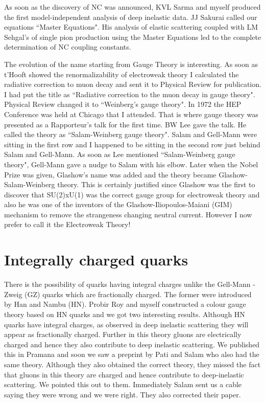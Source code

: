 As soon as the discovery of NC was announced, KVL Sarma and myself 
produced the first model-independent analysis of deep inelastic data. JJ 
Sakurai called our equations ``Master Equations". His analysis of elastic 
scattering coupled with LM Sehgal's of single pion production using the 
Master Equations led to the complete determination of NC coupling 
constants.

The evolution of the name starting from Gauge Theory is interesting. As 
soon as t'Hooft showed the renormalizability of electroweak theory I 
calculated the radiative correction to muon decay and sent it to 
Physical Review for publication. I had put the title as ``Radiative 
correction to the muon decay in gauge theory". Physical Review changed 
it to ``Weinberg's gauge theory". In 1972 the HEP Conference was held at 
Chicago that I attended. That is where gauge theory was presented as a 
Rapporteur's talk for the first time. BW Lee gave the talk. He called 
the theory as ``Salam-Weinberg gauge theory". Salam and Gell-Mann were 
sitting in the first row and I happened to be sitting in the second row 
just behind Salam and Gell-Mann. As soon as Lee mentioned 
``Salam-Weinberg gauge theory", Gell-Mann gave a nudge to Salam with his 
elbow. Later when the Nobel Prize was given, Glashow's name was added 
and the theory became Glashow-Salam-Weinberg theory. This is certainly 
justified since Glashow was the first to discover that SU(2)xU(1) was 
the correct gauge group for electroweak theory and also he was one of 
the inventors of the Glashow-Iliopoulos-Maiani (GIM) mechanism to remove 
the strangeness changing neutral current. However I now prefer to call 
it the Electroweak Theory!

\section*{Integrally charged quarks}

There is the possibility of quarks having integral charges unlike the 
Gell-Mann - Zweig (GZ) quarks which are fractionally charged. The former 
were introduced by Han and Nambu (HN). Probir Roy and myself constructed 
a colour gauge theory based on HN quarks and we got two interesting 
results. Although HN quarks have integral charges, as observed in deep 
inelastic scattering they will appear as fractionally charged. Further 
in this theory gluons are electrically charged and hence they also 
contribute to deep inelastic scattering. We published this in Pramana 
and soon we saw a preprint by Pati and Salam who also had the same 
theory. Although they also obtained the correct theory, they missed the 
fact that gluons in this theory are charged and hence contribute to 
deep-inelastic scattering. We pointed this out to them. Immediately 
Salam sent us a cable saying they were wrong and we were right. They 
also corrected their paper.

